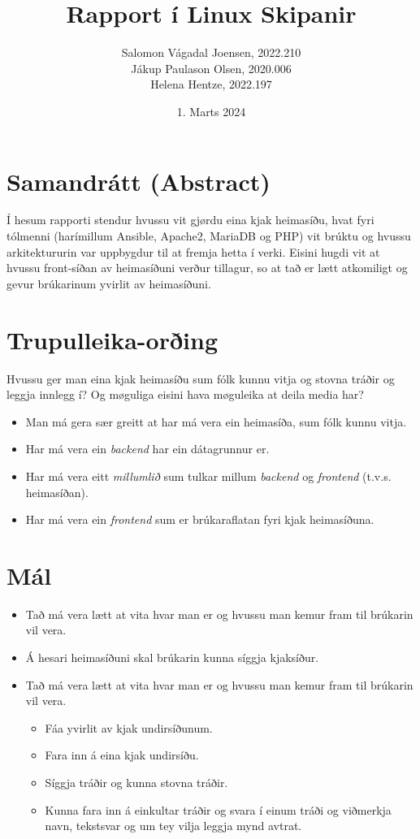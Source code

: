 \documentclass{article}
\title{Rapport í Linux Skipanir}
\author{Salomon Vágadal Joensen, 2022.210\\Jákup Paulason Olsen, 2020.006\\Helena Hentze, 2022.197}
\date{1. Marts 2024}
\begin{document}


\tableofcontents
\newpage

\section{Samandrátt (Abstract)}
\par Í hesum rapporti stendur hvussu vit gjørdu eina kjak heimasíðu, hvat fyri tólmenni
(harímillum Ansible, Apache2, MariaDB og PHP) vit brúktu og hvussu arkitektururin var uppbygdur
til at fremja hetta í verki. Eisini hugdi vit at hvussu front-síðan av heimasíðuni verður tillagur, 
so at tað er lætt atkomiligt og gevur brúkarinum yvirlit av heimasíðuni.

\section{Trupulleika-orðing}
\par Hvussu ger man eina kjak heimasíðu sum fólk kunnu vitja og stovna tráðir og leggja innlegg í? 
Og møguliga eisini hava møguleika at deila media har? 
\begin{itemize}
    \item Man má gera sær greitt at har má vera ein heimasíða, sum fólk kunnu vitja.
    \item Har má vera ein \textit{backend} har ein dátagrunnur er.
    \item Har má vera eitt \textit{millumlið} sum tulkar millum \textit{backend}
            og \textit{frontend} (t.v.s. heimasíðan).
    \item Har má vera ein \textit{frontend} sum er brúkaraflatan fyri kjak heimasíðuna.
\end{itemize}

\section{Mál}

\begin{itemize}
    \item Tað má vera lætt at vita hvar man er og hvussu man kemur fram til brúkarin vil vera.
    \item Á hesari heimasíðuni skal brúkarin kunna síggja kjaksíður.
    \item Tað má vera lætt at vita hvar man er og hvussu man kemur fram til brúkarin vil vera.
    \begin{itemize}
        \item Fáa yvirlit av kjak undirsíðunum.
        \item Fara inn á eina kjak undirsíðu.
        \item Síggja tráðir og kunna stovna tráðir.
        \item Kunna fara inn á einkultar tráðir og svara í einum tráði og viðmerkja navn, tekstsvar og um tey vilja leggja mynd avtrat. 
    \end{itemize}
\end{itemize} 
\end{document}
